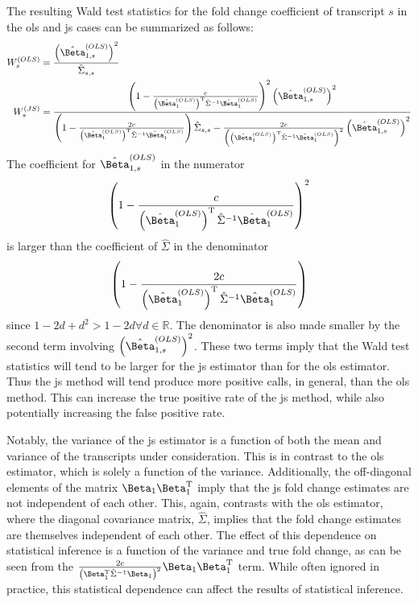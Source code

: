 The resulting Wald test statistics for the fold change coefficient of transcript $s$ in the \gls{ols} and \gls{js} cases can be summarized as follows:
%
\begin{align}
  W_s^{(OLS)} & = \frac{ \left( \hat{\Beta}_{1, s}^{(OLS)} \right)^2 }{ \hat{\Sigma}_{s,s} } \\
  W_s^{(JS)}  & = \frac{
  \left( 1 - \frac{ c }{ \left( \hat{\Beta}_1^{(OLS)} \right)^\tran \hat{\Sigma}^{-1} \hat{\Beta}_1^{(OLS)} } \right)^2 \left( \hat{\Beta}_{1, s}^{(OLS)} \right)^2
  }{
  \left(1 - \frac{2c}{ \left( \hat{\Beta}_1^{(OLS)} \right)^\tran \hat{\Sigma}^{-1} \hat{\Beta}_1^{(OLS)}} \right) \hat{\Sigma}_{s,s}
  - \frac{2c}{\left( \left( \hat{\Beta}_1^{(OLS)} \right)^\tran \hat{\Sigma}^{-1} \hat{\Beta}_1^{(OLS)} \right)^2} \left( \hat{\Beta}_{1, s}^{(OLS)} \right)^2
  }
\end{align}
%
The coefficient for $\hat{\Beta}_{1,s}^{(OLS)}$ in the numerator
\begin{equation}
  \left( 1 - \frac{ c }{ \left( \hat{\Beta}_1^{(OLS)} \right)^\tran \hat{\Sigma}^{-1} \hat{\Beta}_1^{(OLS)} } \right)^2
\end{equation}
%
is larger than the coefficient of $\hat{\Sigma}$ in the denominator
\begin{equation}
  \left(1 - \frac{2c}{ \left( \hat{\Beta}_1^{(OLS)} \right)^\tran \hat{\Sigma}^{-1} \hat{\Beta}_1^{(OLS)}} \right)
\end{equation}
%
since $1 - 2d + d^2 > 1 - 2d \forall d \in \mathbb{R}$.
The denominator is also made smaller by the second term involving $\left( \hat{\Beta}_{1,s}^{(OLS)} \right)^2$.
These two terms imply that the Wald test statistics will tend to be larger for the \gls{js} estimator than for the \gls{ols} estimator.
Thus the \gls{js} method will tend produce more positive calls, in general, than the \gls{ols} method.
This can increase the true positive rate of the \gls{js} method, while also potentially increasing the false positive rate.

Notably, the variance of the \gls{js} estimator is a function of both the mean and variance of the transcripts under consideration.
This is in contrast to the \gls{ols} estimator, which is solely a function of the variance.
Additionally, the off-diagonal elements of the matrix $\Beta_1 \Beta_1^\tran$ imply that the \gls{js} fold change estimates are not independent of each other.
This, again, contrasts with the \gls{ols} estimator, where the diagonal covariance matrix, $\hat{\Sigma}$, implies that the fold change estimates are themselves independent of each other.
The effect of this dependence on statistical inference is a function of the variance and true fold change, as can be seen from the $\frac{2c}{\left( \Beta_1^\tran \hat{\Sigma}^{-1} \Beta_1 \right)^2} \Beta_1 \Beta_1^\tran$ term.
While often ignored in practice, this statistical dependence can affect the results of statistical inference.
